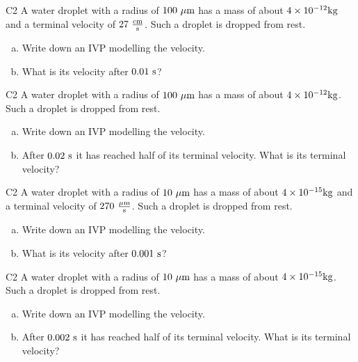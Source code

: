 \begin{problem}{C2}
A water droplet with a radius of \(100\ {\rm \mu m}\) has a mass of about \(4 \times 10^{-12} {\rm kg}\) and a terminal velocity of \(27\ {\rm \frac{cm}{s}}\).  Such a droplet is dropped from rest.  
\begin{enumerate}[(a)]
\item Write down an IVP modelling the velocity.
\item What is its velocity after \(0.01\ {\rm s}\)?
\end{enumerate}
\end{problem}

\begin{problem}{C2}
A water droplet with a radius of \(100\ {\rm \mu m}\) has a mass of about \(4 \times 10^{-12} {\rm kg}\).  Such a droplet is dropped from rest.  
\begin{enumerate}[(a)]
\item Write down an IVP modelling the velocity.
\item After \(0.02\ {\rm s}\) it has reached half of its terminal velocity.  What is its terminal velocity?
\end{enumerate}
\end{problem}

\begin{problem}{C2}
A water droplet with a radius of \(10\ {\rm \mu m}\) has a mass of about \(4 \times 10^{-15} {\rm kg}\) and a terminal velocity of \(270 \ {\rm \frac{\mu m}{s}}\).  Such a droplet is dropped from rest.  
\begin{enumerate}[(a)]
\item Write down an IVP modelling the velocity.
\item What is its velocity after \(0.001\ {\rm s}\)?
\end{enumerate}
\end{problem}

\begin{problem}{C2}
A water droplet with a radius of \(10\ {\rm \mu m}\) has a mass of about \(4 \times 10^{-15} {\rm kg}\).  Such a droplet is dropped from rest.   
\begin{enumerate}[(a)]
\item Write down an IVP modelling the velocity.
\item After \(0.002\ {\rm s}\) it has reached half of its terminal velocity.  What is its terminal velocity?
\end{enumerate}
\end{problem}

